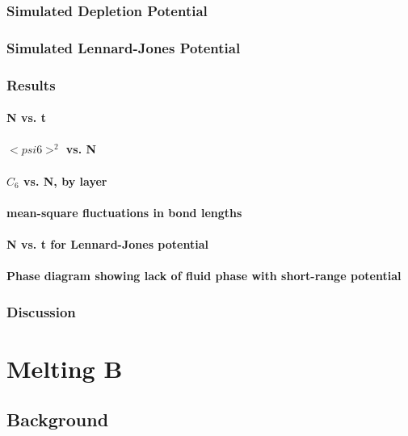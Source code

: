 \documentclass{umthesis}
\begin{document}
\subsection{Simulated Depletion Potential}
\label{sec-1.3.4}
\subsection{Simulated Lennard-Jones Potential}
\label{sec-1.3.5}
\subsection{Results}
\label{sec-1.3.6}
\subsubsection{N vs. t}
\label{sec-1.3.6.1}
\subsubsection{$< psi6 >^2$ vs. N}
\label{sec-1.3.6.2}
\subsubsection{$C_6$ vs. N, by layer}
\label{sec-1.3.6.3}
\subsubsection{mean-square fluctuations in bond lengths}
\label{sec-1.3.6.4}
\subsubsection{N vs. t for Lennard-Jones potential}
\label{sec-1.3.6.5}
\subsubsection{Phase diagram showing lack of fluid phase with short-range potential}
\label{sec-1.3.6.6}
\subsection{Discussion}
\label{sec-1.3.7}
\chapter{Melting B}
\label{sec-2}
\section{Background}
\label{sec-2.1}
\end{document}
